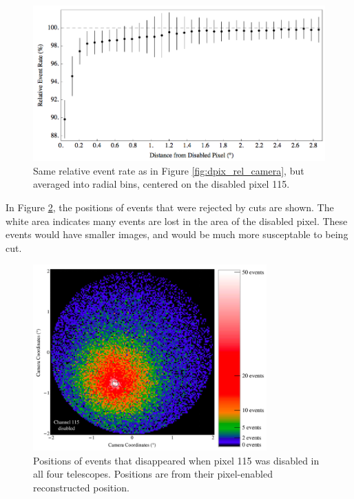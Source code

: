     \begin{figure}[ht]
      \centering
      \includegraphics[width=\textwidth]{images/disabled_pixel/relativerate_radial}
      \caption[Radial Relative Event Rate]{
        Same relative event rate as in Figure \ref{fig:dpix_rel_camera}, but averaged into radial bins, centered on the disabled pixel 115.
      }
      \label{fig:dpix_rel_radial}
    \end{figure}

    In Figure \ref{fig:dpix_disappear}, the positions of events that were rejected by cuts are shown.
    The white area indicates many events are lost in the area of the disabled pixel.
    These events would have smaller images, and would be much more susceptable to being cut.

    \begin{figure}[ht]
      \centering
      \includegraphics[width=0.8\textwidth]{images/disabled_pixel/disappearing_events}
      \caption[Disappearing Events]{
        Positions of events that disappeared when pixel 115 was disabled in all four telescopes.
        Positions are from their pixel-enabled reconstructed position.
      }
      \label{fig:dpix_disappear}
    \end{figure}

